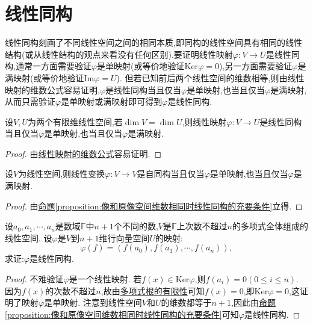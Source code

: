 \documentclass[../../main.tex]{subfiles}%
\begin{document}
\section{线性同构}
线性同构刻画了不同线性空间之间的相同本质,即同构的线性空间具有相同的线性结构(或从线性结构的观点来看没有任何区别).要证明线性映射\(\varphi:V\to U\)是线性同构,通常一方面需要验证\(\varphi\)是单映射(或等价地验证\(\text{Ker}\varphi = 0\)),另一方面需要验证\(\varphi\)是满映射(或等价地验证\(\text{Im}\varphi = U\)). 但若已知前后两个线性空间的维数相等,则由线性映射的维数公式容易证明,\(\varphi\)是线性同构当且仅当\(\varphi\)是单映射,也当且仅当\(\varphi\)是满映射,从而只需验证\(\varphi\)是单映射或满映射即可得到\(\varphi\)是线性同构.

\begin{proposition}\label{proposition:像和原像空间维数相同时线性同构的充要条件}
设$V,U$为两个有限维线性空间,若\(\dim V = \dim U\),则线性映射\(\varphi:V\rightarrow U\)是线性同构当且仅当\(\varphi\)是单映射,也当且仅当\(\varphi\)是满映射.
\end{proposition}
\begin{proof}
由\hyperref[theorem:线性映射的维数公式]{线性映射的维数公式}容易证明.
\end{proof}

\begin{corollary}\label{corollary:线性变换自同构的充要条件}
设$V$为线性空间,则线性变换\(\varphi:V\rightarrow V\)是自同构当且仅当\(\varphi\)是单映射,也当且仅当\(\varphi\)是满映射.
\end{corollary}
\begin{proof}
由\hyperref[proposition:像和原像空间维数相同时线性同构的充要条件]{命题\ref{proposition:像和原像空间维数相同时线性同构的充要条件}}立得.
\end{proof}

\begin{lemma}\label{lemma:证明Lagrange插值公式}
设\(a_0,a_1,\cdots,a_n\)是数域\(\mathbb{F}\)中\(n + 1\)个不同的数,\(V\)是\(\mathbb{F}\)上次数不超过\(n\)的多项式全体组成的线性空间. 设\(\varphi\)是\(V\)到\(n + 1\)维行向量空间\(U\)的映射:
\[
\varphi(f)=(f(a_0),f(a_1),\cdots,f(a_n)),
\]
求证:\(\varphi\)是线性同构.
\end{lemma}
\begin{proof}
不难验证\(\varphi\)是一个线性映射. 若\(f(x)\in\text{Ker}\varphi\),则\(f(a_i)=0(0\leqslant  i\leqslant  n)\). 因为\(f(x)\)的次数不超过\(n\),故由\hyperref[proposition:多项式根的有限性]{多项式根的有限性}可知\(f(x)=0\),即\(\text{Ker}\varphi = 0\),这证明了映射\(\varphi\)是单映射. 注意到线性空间\(V\)和\(U\)的维数都等于\(n + 1\),因此由\hyperref[proposition:像和原像空间维数相同时线性同构的充要条件]{命题\ref{proposition:像和原像空间维数相同时线性同构的充要条件}}可知\(\varphi\)是线性同构.
\end{proof}
\end{document}
